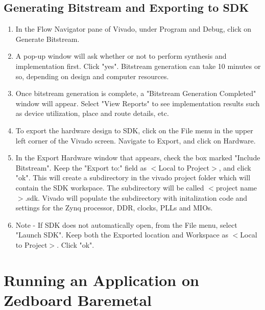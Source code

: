 \documentclass[12pt]{article}
\begin{document}
\subsection{Generating Bitstream and Exporting to SDK}\label{subsec:Exporting to SDK}
\begin{enumerate}

\item In the Flow Navigator pane of Vivado, under Program and Debug, click on Generate Bitstream.  
\item A pop-up window will ask whether or not to perform synthesis and implementation first.  Click "yes".  Bitstream generation can take 10 minutes or so, depending on design and computer resources.
\item Once bitstream generation is complete, a "Bitstream Generation Completed" window will appear.  Select "View Reports" to see implementation results such as device utilization, place and route details, etc.
\item To export the hardware design to SDK, click on the File menu in the upper left corner of the Vivado screen.  Navigate to Export, and click on Hardware.  
\item In the Export Hardware window that appears, check the box marked "Include Bitstream".  Keep the "Export to:" field as $<$Local to Project$>$, and click "ok".  This will create a subdirectory in the vivado project folder which will contain the SDK workspace.  The subdirectory will be called $<$project name$>$.sdk.  Vivado will populate the subdirectory with initalization code and settings for the Zynq processor, DDR, clocks, PLLs and MIOs.
\item Note - If SDK does not automatically open, from the File menu, select "Launch SDK".  Keep both the Exported location and Workspace as $<$Local to Project$>$.  Click "ok". 

\end{enumerate}
\section{Running an Application on Zedboard Baremetal}


\end{document}

